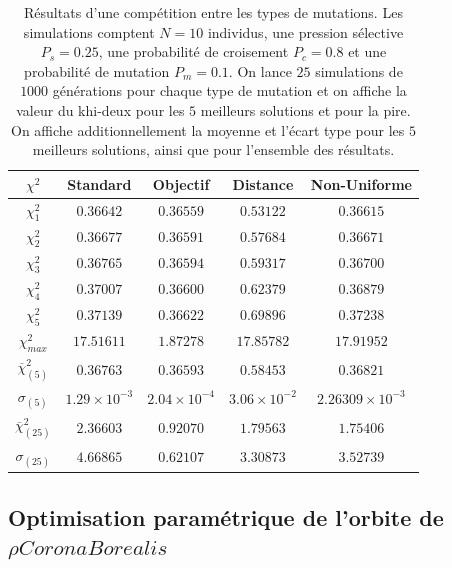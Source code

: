 \documentclass{article}
\begin{document}
\begin{table}[H]
	\begin{center}
		\caption{Résultats d'une compétition entre les types de mutations. Les simulations comptent $N=10$ individus, une pression sélective $P_s=0.25$, une probabilité de croisement $P_c=0.8$ et une probabilité de mutation $P_m=0.1$. On lance $25$ simulations de $1000$ générations pour chaque type de mutation et on affiche la valeur du khi-deux pour les $5$ meilleurs solutions et pour la pire. On affiche additionnellement la moyenne et l'écart type pour les $5$ meilleurs solutions, ainsi que pour l'ensemble des résultats.}
		\label{tab:competition}
		\begin{tabular}{|c|c|c|c|c|} %
			\hline	
			\textbf{$\chi^2$} & \textbf{Standard} & \textbf{Objectif} & \textbf{Distance} & \textbf{Non-Uniforme}\\\hline\hline
			$\chi_1^2$ & $0.36642$ & $0.36559$ & $0.53122$ & $0.36615$\\
			$\chi_2^2$ & $0.36677$ & $0.36591$ & $0.57684$ & $0.36671$\\
			$\chi_3^2$ & $0.36765$ & $0.36594$ & $0.59317$ & $0.36700$\\
			$\chi_4^2$ & $0.37007$ & $0.36600$ & $0.62379$ & $0.36879$\\
			$\chi_5^2$ & $0.37139$ & $0.36622$ & $0.69896$ & $0.37238$\\
			$\chi_{max}^{2}$ & $17.51611$ & $1.87278$ & $17.85782$ & $17.91952$\\\hline\hline
			$\overline{\chi}_{(5)}^{2}$ & $0.36763$ & $0.36593$ & $0.58453$ & $0.36821$\\\hline
			$\sigma_{(5)}$ & $1.29\times10^{-3}$ & $2.04\times10^{-4}$ & $3.06\times10^{-2}$ & $2.26309\times10^{-3}$\\\hline
			$\overline{\chi}_{(25)}^{2}$ & $2.36603$ & $0.92070$ & $1.79563$ & $1.75406$\\\hline
			$\sigma_{(25)}$ & $4.66865$ & $0.62107$ & $3.30873$ & $3.52739$\\\hline
		\end{tabular}
	\end{center}
\end{table}

\subsection{Optimisation paramétrique de l'orbite de $\rho CoronaBorealis$}
\end{document}
